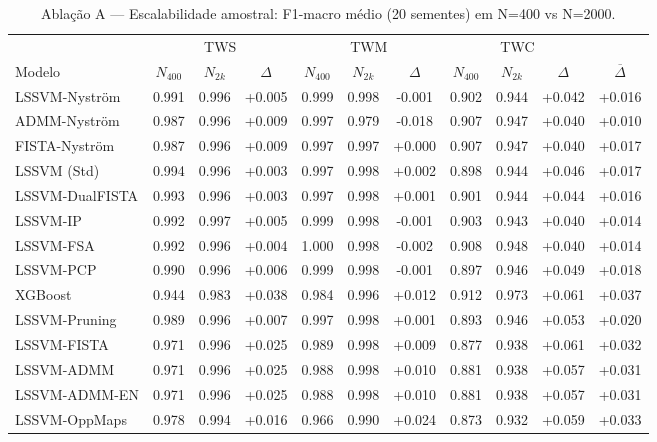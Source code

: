 \begin{table}[ht]
  \centering
  \caption{Ablação A — Escalabilidade amostral: F1-macro médio (20 sementes) em N=400 vs N=2000.}
  \label{tab:ablation_a}
  \footnotesize
  \begin{tabular}{lcccccccccc}
    \toprule
    \multicolumn{1}{c}{} & \multicolumn{3}{c}{TWS} & \multicolumn{3}{c}{TWM} & \multicolumn{3}{c}{TWC} & \multicolumn{1}{c}{} \\
    \cmidrule(lr){2-4}\cmidrule(lr){5-7}\cmidrule(lr){8-10}
    Modelo & $N_{400}$ & $N_{2k}$ & $\Delta$ & $N_{400}$ & $N_{2k}$ & $\Delta$ & $N_{400}$ & $N_{2k}$ & $\Delta$ & $\overline{\Delta}$ \\
    \midrule
    LSSVM-Nyström & 0.991 & 0.996 & +0.005 & 0.999 & 0.998 & -0.001 & 0.902 & 0.944 & +0.042 & +0.016 \\
    ADMM-Nyström & 0.987 & 0.996 & +0.009 & 0.997 & 0.979 & -0.018 & 0.907 & 0.947 & +0.040 & +0.010 \\
    FISTA-Nyström & 0.987 & 0.996 & +0.009 & 0.997 & 0.997 & +0.000 & 0.907 & 0.947 & +0.040 & +0.017 \\
    LSSVM (Std) & 0.994 & 0.996 & +0.003 & 0.997 & 0.998 & +0.002 & 0.898 & 0.944 & +0.046 & +0.017 \\
    LSSVM-DualFISTA & 0.993 & 0.996 & +0.003 & 0.997 & 0.998 & +0.001 & 0.901 & 0.944 & +0.044 & +0.016 \\
    LSSVM-IP & 0.992 & 0.997 & +0.005 & 0.999 & 0.998 & -0.001 & 0.903 & 0.943 & +0.040 & +0.014 \\
    LSSVM-FSA & 0.992 & 0.996 & +0.004 & 1.000 & 0.998 & -0.002 & 0.908 & 0.948 & +0.040 & +0.014 \\
    LSSVM-PCP & 0.990 & 0.996 & +0.006 & 0.999 & 0.998 & -0.001 & 0.897 & 0.946 & +0.049 & +0.018 \\
    XGBoost & 0.944 & 0.983 & +0.038 & 0.984 & 0.996 & +0.012 & 0.912 & 0.973 & +0.061 & +0.037 \\
    LSSVM-Pruning & 0.989 & 0.996 & +0.007 & 0.997 & 0.998 & +0.001 & 0.893 & 0.946 & +0.053 & +0.020 \\
    LSSVM-FISTA & 0.971 & 0.996 & +0.025 & 0.989 & 0.998 & +0.009 & 0.877 & 0.938 & +0.061 & +0.032 \\
    LSSVM-ADMM & 0.971 & 0.996 & +0.025 & 0.988 & 0.998 & +0.010 & 0.881 & 0.938 & +0.057 & +0.031 \\
    LSSVM-ADMM-EN & 0.971 & 0.996 & +0.025 & 0.988 & 0.998 & +0.010 & 0.881 & 0.938 & +0.057 & +0.031 \\
    LSSVM-OppMaps & 0.978 & 0.994 & +0.016 & 0.966 & 0.990 & +0.024 & 0.873 & 0.932 & +0.059 & +0.033 \\

\end{tabular}
\end{table}
